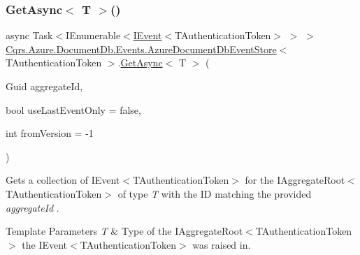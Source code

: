 \subsubsection{\texorpdfstring{Get\+Async$<$ T $>$()}{GetAsync< T >()}}
{\footnotesize\ttfamily async Task$<$I\+Enumerable$<$\hyperlink{interfaceCqrs_1_1Events_1_1IEvent}{I\+Event}$<$T\+Authentication\+Token$>$ $>$ $>$ \hyperlink{classCqrs_1_1Azure_1_1DocumentDb_1_1Events_1_1AzureDocumentDbEventStore}{Cqrs.\+Azure.\+Document\+Db.\+Events.\+Azure\+Document\+Db\+Event\+Store}$<$ T\+Authentication\+Token $>$.\hyperlink{classCqrs_1_1Azure_1_1DocumentDb_1_1Events_1_1AzureDocumentDbEventStore_a8b481bf0b0f6b50184441965630f5443_a8b481bf0b0f6b50184441965630f5443}{Get\+Async}$<$ T $>$ (\begin{DoxyParamCaption}\item[{Guid}]{aggregate\+Id,  }\item[{bool}]{use\+Last\+Event\+Only = {\ttfamily false},  }\item[{int}]{from\+Version = {\ttfamily -\/1} }\end{DoxyParamCaption})\hspace{0.3cm}{\ttfamily [protected]}}



Gets a collection of I\+Event$<$\+T\+Authentication\+Token$>$ for the I\+Aggregate\+Root$<$\+T\+Authentication\+Token$>$ of type {\itshape T}  with the ID matching the provided {\itshape aggregate\+Id} . 


\begin{DoxyTemplParams}{Template Parameters}
{\em T} & Type of the I\+Aggregate\+Root$<$\+T\+Authentication\+Token$>$ the I\+Event$<$\+T\+Authentication\+Token$>$ was raised in.\\
\hline
\end{DoxyTemplParams}

